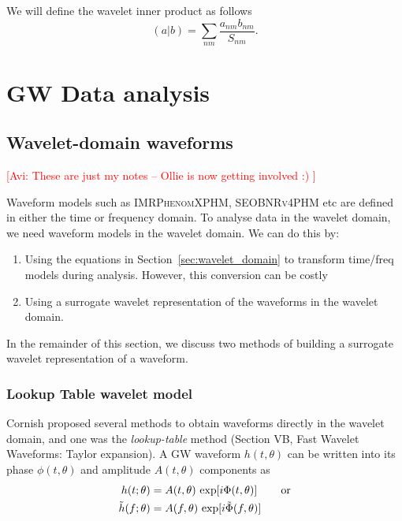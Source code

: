 \documentclass{article}
\newcommand{\avi}[1]{\textcolor{red}{[Avi: #1]}}
\begin{document}
We will define the wavelet inner product as follows
\begin{equation}
(a|b) = \sum_{nm}\frac{a_{nm}b_{nm}}{S_{nm}}.
\end{equation}




\newpage

\section{GW Data analysis}
\subsection{Wavelet-domain waveforms}
\avi{These are just my notes -- Ollie is now getting involved :) }

Waveform models such as \textsc{IMRPhenomXPHM}, \textsc{SEOBNRv4PHM} etc are defined in either the time or frequency domain. To analyse data in the wavelet domain, we need waveform models in the wavelet domain. We can do this by:
\begin{enumerate}
    \item Using the equations in Section~\ref{sec:wavelet_domain} to transform time/freq models during analysis. However, this conversion can be costly
    \item Using a surrogate wavelet representation of the waveforms in the wavelet domain.
\end{enumerate}

In the remainder of this section, we discuss two methods of building a surrogate wavelet representation of a waveform.

\subsubsection{Lookup Table wavelet model}
Cornish proposed several methods to obtain waveforms directly in the wavelet domain, and one was the \textit{lookup-table} method (Section VB, Fast Wavelet Waveforms: Taylor expansion). A GW waveform $h(t, \theta)$ can be written into its phase $\phi(t, \theta)$ and amplitude $A(t,\theta)$ components as 
\begin{align}
h(t;\theta)&=A(t,\theta)\ {\rm exp}[i\Phi(t,\theta)]\,\hspace{2em} {\rm or} \label{eq:ht}\\
\tilde{h}(f;\theta)&=A(f,\theta)\ {\rm exp}[i\tilde{\Phi}(f,\theta)]\,
\end{align}
\end{document}
